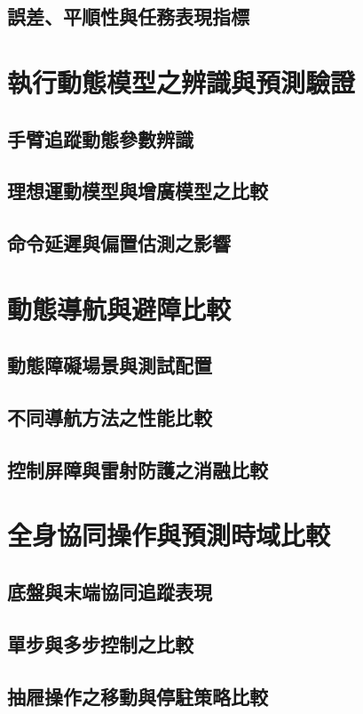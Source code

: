 \subsection{誤差、平順性與任務表現指標}

\section{執行動態模型之辨識與預測驗證}
\subsection{手臂追蹤動態參數辨識}
\subsection{理想運動模型與增廣模型之比較}
\subsection{命令延遲與偏置估測之影響}

\section{動態導航與避障比較}
\subsection{動態障礙場景與測試配置}
\subsection{不同導航方法之性能比較}
\subsection{控制屏障與雷射防護之消融比較}

\section{全身協同操作與預測時域比較}
\subsection{底盤與末端協同追蹤表現}
\subsection{單步與多步控制之比較}
\subsection{抽屜操作之移動與停駐策略比較}

